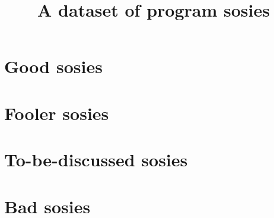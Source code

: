 \documentclass{article}
\title{A dataset of program sosies}
\author{}
\begin{document}
\maketitle

\section{Good sosies}






\section{Fooler sosies}
\label{sec:foolers}



\section{To-be-discussed sosies}





\section{Bad sosies}



% 
% 
\end{document}
